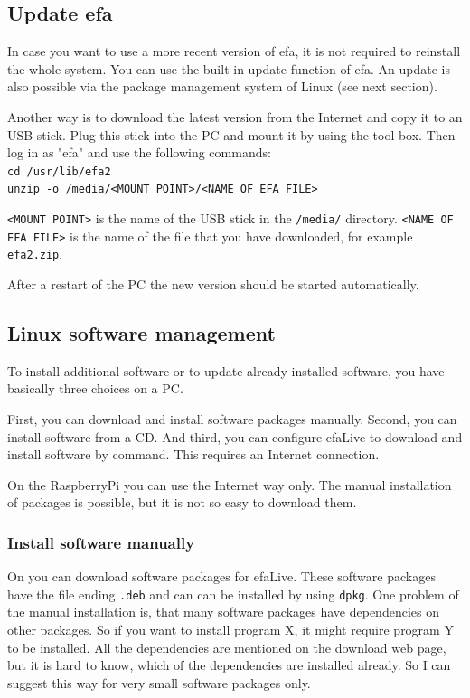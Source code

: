 \documentclass[a4paper,12pt,twoside]{article}
\begin{document}
\subsection{Update efa}
\label{sct:update_efa}
In case you want to use a more recent version of efa, it is not required
to reinstall the whole system. You can use the built in update function
of efa. An update is also possible via the package management system of Linux
(see next section).

Another way is to download the latest version from the Internet
\cite{EFA1} and copy it to an USB stick. Plug this stick into the PC
and mount it by using the tool box. Then log in as
"efa" and use the following commands:
\bigskip
\\
\texttt{cd /usr/lib/efa2\\
unzip -o /media/{\textless}MOUNT POINT{\textgreater}/{\textless}NAME OF
EFA FILE{\textgreater}}

\bigskip
\texttt{{\textless}MOUNT POINT{\textgreater}} is the name of the USB stick in the
\texttt{/media/} directory. \texttt{{\textless}NAME OF EFA FILE{\textgreater}} is the
name of the file that you have downloaded, for example
\texttt{efa2.zip}.

After a restart of the PC the new version should be started
automatically.


\subsection{Linux software management}
\label{sct:linux_software}
To install additional software or to update already installed software,
you have basically three choices on a PC.

First, you can download and install software packages manually. Second,
you can install software from a CD. And third, you can configure
efaLive to download and install software by command. This requires an
Internet connection.

On the RaspberryPi you can use the Internet way only. The manual installation
of packages is possible, but it is not so easy to download them.


\subsubsection{Install software manually}
\label{sct:software_manually}
On \cite{DEB3} you can download software packages for efaLive. These
software packages have the file ending
\texttt{.deb} and can can be installed by using
\texttt{dpkg}. One problem of the manual
installation is, that many software packages have dependencies on other
packages. So if you want to install program X, it might require program
Y to be installed. All the dependencies are mentioned on the download
web page, but it is hard to know, which of the dependencies are
installed already. So I can suggest this way for very small software
packages only.
\end{document}

